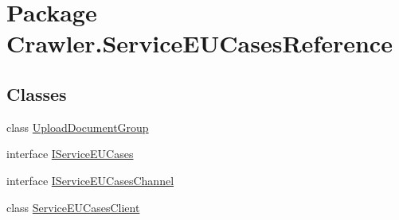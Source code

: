 \hypertarget{namespace_crawler_1_1_service_e_u_cases_reference}{\section{Package Crawler.\-Service\-E\-U\-Cases\-Reference}
\label{namespace_crawler_1_1_service_e_u_cases_reference}
}
\subsection*{Classes}
\begin{DoxyCompactItemize}
\item 
class \hyperlink{class_crawler_1_1_service_e_u_cases_reference_1_1_upload_document_group}{Upload\-Document\-Group}
\item 
interface \hyperlink{interface_crawler_1_1_service_e_u_cases_reference_1_1_i_service_e_u_cases}{I\-Service\-E\-U\-Cases}
\item 
interface \hyperlink{interface_crawler_1_1_service_e_u_cases_reference_1_1_i_service_e_u_cases_channel}{I\-Service\-E\-U\-Cases\-Channel}
\item 
class \hyperlink{class_crawler_1_1_service_e_u_cases_reference_1_1_service_e_u_cases_client}{Service\-E\-U\-Cases\-Client}
\end{DoxyCompactItemize}
